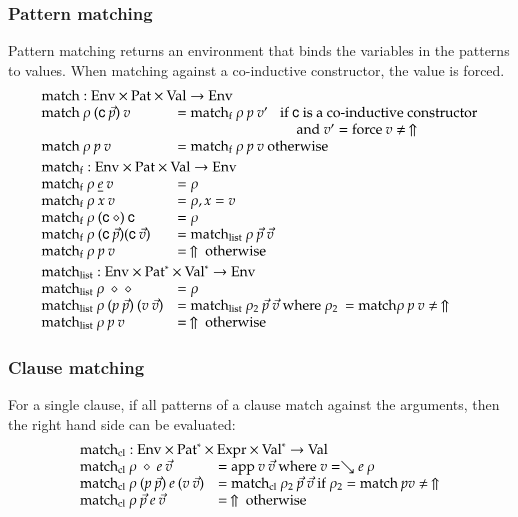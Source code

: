 \subsubsection{Pattern matching}
Pattern matching returns an environment that binds the variables in the patterns to values.
When matching against a co-inductive constructor, the value is forced.
\[
\begin{array}{ll}
\multicolumn{2}{l}{\match : \Env \times \Pat \times \Val \ra \Env}\\
\match \: \rho \: (\cc \: \vec{p}) \: v & = \matchf \: \rho \: p \: v' \spc \mbox{if  } \cc  \mbox{ is a co-inductive constructor}\\
& \spcx \spcx \spcx \mbox{and } v' = \forc \: v \neq \stuck \\
\match \: \rho \: p \: v & = \matchf \: \rho \: p \: v \mbox{ otherwise}
\vs\\
\multicolumn{2}{l}{\matchf : \Env \times \Pat \times \Val \ra \Env}\\
\matchf \: \rho \: \inacc{e} \: v & = \rho \\
\matchf \: \rho \: x \: v & = \ins{\rho}{x}{v} \\
\matchf \: \rho \: (\cc \: \diamond) \: \cc & = \rho \\
\matchf \: \rho \: (\cc \: \vec{p}) (\cc \: \vec{v}) & = \matchList \: \rho \: \vec{p} \: \vec{v} \\
\matchf \: \rho \: p \: v & = \stuck \mbox{ otherwise}
\vs\\
\multicolumn{2}{l}{\matchList : \Env \times \ves{\Pat} \times \ves{\Val} \ra \Env }\\
\matchList \: \rho \: \diamond \: \diamond & = \rho \\
\matchList \: \rho \: (p \: \vec{p}) \: (v \: \vec{v}) & = \matchList \: \rho_2 \: \vec{p} \: \vec{v} \mbox{ where } \rho_2 \: = \match \rho \: p \: v \neq \stuck \\
\matchList \: \rho \: p \: v & = \stuck \mbox { otherwise } \\
\end{array}
\]

\subsubsection{Clause matching}
For a single clause, if all patterns of a clause match against the arguments, then the right hand side can be evaluated: 
\[
\begin{array}{ll}
\multicolumn{2}{l}{\matchcl : \Env \times \ves{\Pat} \times \Expr \times \ves{\Val} \ra \Val}\\
\matchcl \: \rho \: \diamond \: e \: \vec{v} & = \ap \: v \: \vec{v} \mbox{ where } v = \wh e \: \rho \\
\matchcl \: \rho \: (p \: \vec{p}) \: e \: (v \: \vec{v}) & = \matchcl \: \rho_2 \: \vec{p} \: \vec{v} \mbox{ if } \rho_2 = \match \: p v \neq \stuck \\  
\matchcl \: \rho \: \vec{p}\: e \: \vec{v} & = \stuck \mbox{ otherwise}\\  
\end{array}
\]

